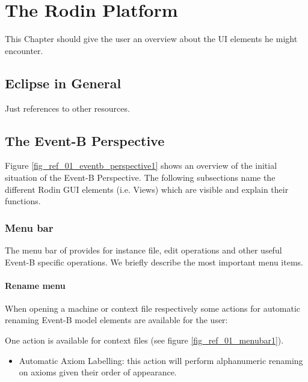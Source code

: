\section{The Rodin Platform}
\label{reference_01}

This Chapter should give the user an overview about the UI elements he might encounter.

\subsection{Eclipse in General}

Just references to other resources.

\subsection{The Event-B Perspective}

Figure \ref{fig_ref_01_eventb_perspective1} shows an overview of the initial situation of the Event-B Perspective. The following subsections name the different Rodin GUI elements (i.e. Views) which are visible and explain their functions.


\subsubsection{Menu bar}

The menu bar of provides for instance file, edit operations and other useful Event-B specific operations. We briefly describe the most important menu items.

\paragraph{Rename menu}

When opening a machine or context file respectively some actions for automatic renaming Event-B model elements are available for the user:

One action is available for context files (see figure \ref{fig_ref_01_menubar1}).

    \begin{itemize}
    	\item Automatic Axiom Labelling: this action will perform alphanumeric renaming on axioms given their order of appearance. 
    \end{itemize}

